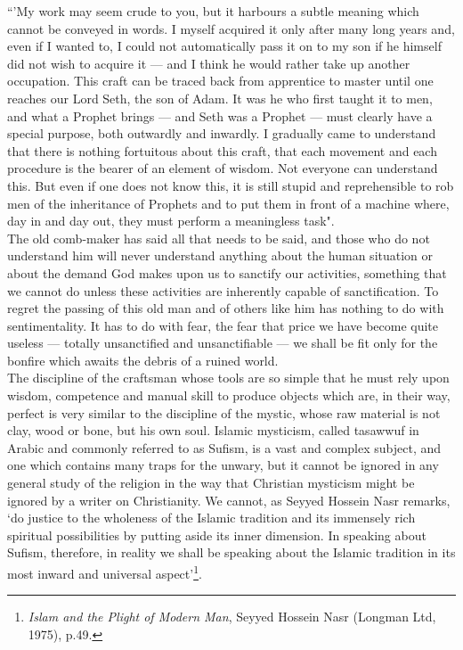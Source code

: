 \documentclass[10pt, twoside,openright]{book}
\begin{document}
``'My work may seem crude to you, but it harbours a subtle meaning which cannot be conveyed in words. 
I myself acquired it only after many long years and, even if I wanted to, I could not automatically 
pass it on to my son if he himself did not wish to acquire it --- and I think he would rather take up 
another occupation. This craft can be traced back from apprentice to master until one reaches our 
Lord Seth, the son of Adam. It was he who first taught it to men, and what a Prophet brings --- and 
Seth was a Prophet --- must clearly have a special purpose, both outwardly and inwardly. I gradually 
came to understand that there is nothing fortuitous about this craft, that each movement and each 
procedure is the bearer of an element of wisdom. Not everyone can understand this. But even if one 
does not know this, it is still stupid and reprehensible to rob men of the inheritance of Prophets 
and to put them in front of a machine where, day in and day out, they must perform a meaningless 
task". \\ 


The old comb\hyp{}maker has said all that needs to be said, and those who do not understand him will never 
understand anything about the human situation or about the demand God makes upon us to sanctify our 
activities, something that we cannot do unless these activities are inherently capable of 
sanctification. To regret the passing of this old man and of others like him has nothing to do with 
sentimentality. It has to do with fear, the fear that price we have become quite useless --- totally 
unsanctified and unsanctifiable --- we shall be fit only for the bonfire which awaits the debris of a 
ruined world. \\

The discipline of the craftsman whose tools are so simple that he must rely upon wisdom, competence 
and manual skill to produce objects which are, in their way, perfect is very similar to the 
discipline of the mystic, whose raw material is not clay, wood or bone, but his own soul. Islamic 
mysticism, called tasawwuf in Arabic and commonly referred to as Sufism, is a vast and complex 
subject, and one which contains many traps for the unwary, but it cannot be ignored in any general 
study of the religion in the way that Christian mysticism might be ignored by a writer on 
Christianity. We cannot, as Seyyed Hossein Nasr remarks, `do justice to the wholeness of the Islamic 
tradition and its immensely rich spiritual possibilities by putting aside its inner dimension. In 
speaking about Sufism, therefore, in reality we shall be speaking about the Islamic tradition in its 
most inward and universal aspect'\footnote{\emph{Islam and the Plight of Modern Man}, Seyyed Hossein Nasr (Longman Ltd, 1975), p.49.}. \\
\end{document}
